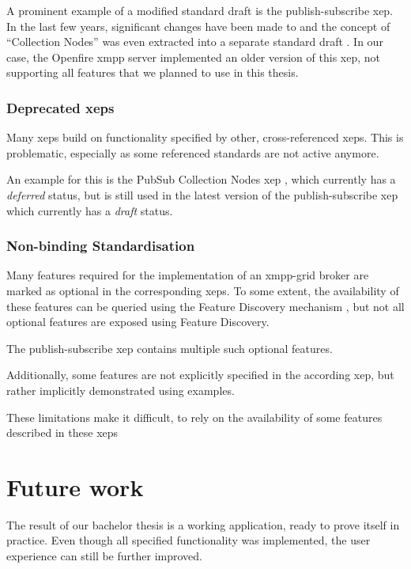 A prominent example of a modified standard draft is the \gls{publish-subscribe} \gls{xep}.
In the last few years, significant changes have been made to and the concept of ``Collection Nodes'' was even extracted into a separate standard draft \cite{xep-0248}.
In our case, the Openfire \gls{xmpp} server implemented an older version of this \gls{xep}, not supporting all features that we planned to use in this thesis.

\subsubsection{Deprecated \glspl{xep}}

Many \glspl{xep} build on functionality specified by other, cross-referenced \glspl{xep}.
This is problematic, especially as some referenced standards are not active anymore.

An example for this is the PubSub Collection Nodes \gls{xep} \cite{xep-0248}, which currently has a \emph{deferred} status, but is still used in the latest version of the \gls{publish-subscribe} \gls{xep} \cite{xep-0060} which currently has a \emph{draft} status.

\subsubsection{Non-binding Standardisation}

Many features required for the implementation of an \gls{xmpp-grid} \gls{broker} are marked as optional in the corresponding \glspl{xep}.
To some extent, the availability of these features can be queried using the Feature Discovery mechanism \cite{xep-0030}, but not all optional features are exposed using Feature Discovery.

The \gls{publish-subscribe} \gls{xep} \cite{xep-0060} contains multiple such optional features.

Additionally, some features are not explicitly specified in the according \gls{xep}, but rather implicitly demonstrated using examples.

These limitations make it difficult, to rely on the availability of some features described in these \glspl{xep}


\section{Future work}
The result of our bachelor thesis is a working application, ready to prove itself in practice.
Even though all specified functionality was implemented, the user experience can still be further improved.

